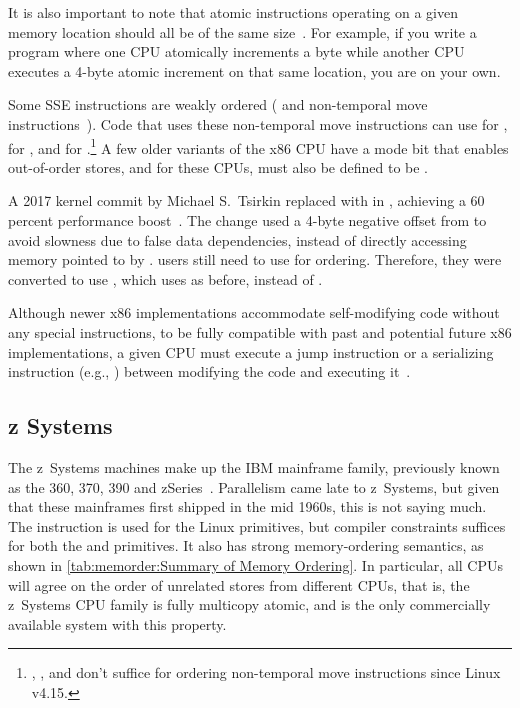 It is also important to note that atomic instructions operating
on a given memory location should all be of the same
size~\cite[Section 8.1.2.2]{Intel64IA32v3A2016}.
For example, if you write a program where one CPU atomically increments
a byte while another CPU executes a 4-byte atomic increment on
that same location, you are on your own.

Some SSE instructions are weakly ordered (
and non-temporal move instructions~\cite{IntelXeonV2b-96a}).
Code that uses these non-temporal move instructions
can use  for ,
 for , and  for .\footnote{
	, , and  don't suffice
	for ordering non-temporal move instructions since Linux v4.15.}
A few older variants of the x86 CPU have a mode bit that enables out-of-order
stores, and for these CPUs,  must also be defined to
be .

A 2017 kernel commit by Michael S.~Tsirkin replaced  with
 in , achieving a 60 percent performance
boost~\cite{Tsirkin2017}.
The change used a 4-byte negative offset from  to avoid
slowness due to false data dependencies, instead of directly
accessing memory pointed to by .
 users still need to use  for ordering.
Therefore, they were converted to use , which uses 
as before, instead of .

Although newer x86 implementations accommodate self-modifying code
without any special instructions, to be fully compatible with
past and potential future x86 implementations, a given CPU must
execute a jump instruction or a serializing instruction (e.g., )
between modifying the code and executing
it~\cite[Section 8.1.3]{Intel64IA32v3A2011}.

\subsection{z Systems}

The z~Systems machines make up the IBM mainframe family, previously
known as the 360, 370, 390 and zSeries~\cite{IBMzSeries04a}.
Parallelism came late to z~Systems, but given that these mainframes first
shipped in the mid 1960s, this is not saying much.
The  instruction is used for the Linux  primitives,
but compiler constraints suffices for both the
 and  primitives.
It also has strong memory-ordering semantics, as shown in
\cref{tab:memorder:Summary of Memory Ordering}.
In particular, all CPUs will agree on the order of unrelated stores from
different CPUs, that is, the z~Systems CPU family is fully multicopy
atomic, and is the only commercially available system with this property.

